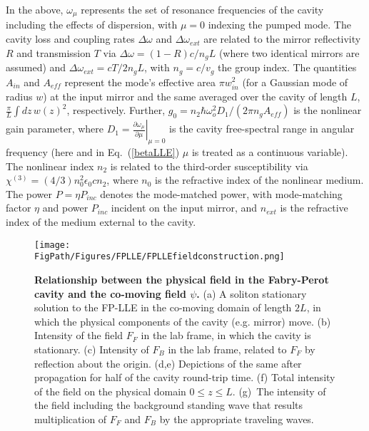 In the above, $\omega_\mu$ represents the set of resonance frequencies of the cavity including the effects of dispersion, with $\mu=0$ indexing the pumped mode. The cavity loss and coupling rates $\Delta\omega$ and $\Delta\omega_{ext}$ are related to the mirror reflectivity $R$ and transmission $T$ via $\Delta\omega=(1-R)c/n_gL$ (where two identical mirrors are assumed) and $\Delta\omega_{ext}=cT/2n_gL$, with $n_g=c/v_g$ the group index. The quantities $A_{in}$ and $A_{eff}$ represent the mode's effective area $\pi w_{in}^2$ (for a Gaussian mode of radius $w$) at the input mirror and the same averaged over the cavity of length $L$, $\frac{\pi}{L}\int dz\, w(z)^2$, respectively. Further, $g_0=n_2\hbar\omega_o^2 D_1/(2\pi n_g A_{eff})$ is the nonlinear gain parameter, where $D_1=\left.\frac{\partial\omega_\mu}{\partial \mu}\right|_{\mu=0}$ is the cavity free-spectral range in angular frequency (here and in Eq.~(\ref{betaLLE}) $\mu$ is treated as a continuous variable). The nonlinear index $n_2$ is related to the third-order susceptibility via $\chi^{(3)}=(4/3)n_0^2\epsilon_0cn_2$, where $n_0$ is the refractive index of the nonlinear medium.  The power $P=\eta P_{inc}$ denotes the mode-matched power, with mode-matching factor $\eta$ and power $P_{inc}$ incident on the input mirror, and $n_{ext}$ is the refractive index of the medium external to the cavity. 

\begin{figure}[htpb]
	\begin{center}
		\texttt{[image: \\FigPath/Figures/FPLLE/FPLLEfieldconstruction.png]}
	\end{center}
	\caption[Relationship between the physical field in the Fabry-Perot cavity and the co-moving field $\psi$]{\textbf{Relationship between the physical field in the Fabry-Perot cavity and the co-moving field $\psi$.} (a) A soliton stationary solution to the FP-LLE in the co-moving domain of length $2L$, in which the physical components of the cavity (e.g. mirror) move. (b) Intensity of the field $F_F$ in the lab frame, in which the cavity is stationary. (c) Intensity of $F_B$ in the lab frame, related to $F_F$ by reflection about the origin. (d,e) Depictions of the same after propagation for half of the cavity round-trip time. (f) Total intensity of the field on the physical domain $0 \leq z \leq L$. (g)~The intensity of the field including the background standing wave that results multiplication of $F_F$ and $F_B$ by the appropriate traveling waves. }
	\label{fig:FPLLEfieldconstruction}
\end{figure} 

